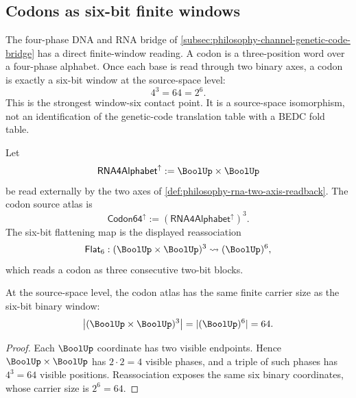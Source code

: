 \subsection{Codons as six-bit finite windows}
\label{subsec:philosophy-codon-window-six-bridge}

The four-phase DNA and RNA bridge of
\autoref{subsec:philosophy-channel-genetic-code-bridge} has a direct
finite-window reading. A codon is a three-position word over a
four-phase alphabet. Once each base is read through two binary axes, a
codon is exactly a six-bit window at the source-space level:
$$
  4^{3}=64=2^{6}.
$$
This is the strongest window-six contact point. It is a source-space
isomorphism, not an identification of the genetic-code translation
table with a BEDC fold table.

\begin{definition}
\label{def:philosophy-codon-six-bit-source-atlas}
Let
$$
  \mathsf{RNA4Alphabet}^{\uparrow}
  :=
  \BoolUp\times\BoolUp
$$
be read externally by the two axes of
\autoref{def:philosophy-rna-two-axis-readback}. The codon source atlas
is
$$
  \mathsf{Codon64}^{\uparrow}
  :=
  (\mathsf{RNA4Alphabet}^{\uparrow})^{3}.
$$
The six-bit flattening map is the displayed reassociation
$$
  \mathsf{Flat}_{6}
  :
  (\BoolUp\times\BoolUp)^{3}
  \rightsquigarrow
  (\BoolUp)^{6},
$$
which reads a codon as three consecutive two-bit blocks.
\end{definition}

\begin{theorem}
\label{thm:philosophy-codon-source-space-six-bit-window}
At the source-space level, the codon atlas has the same finite carrier
size as the six-bit binary window:
$$
  \left|(\BoolUp\times\BoolUp)^{3}\right|
  =
  |(\BoolUp)^{6}|
  =
  64.
$$
\end{theorem}
\begin{proof}
Each $\BoolUp$ coordinate has two visible endpoints. Hence
$\BoolUp\times\BoolUp$ has $2\cdot 2=4$ visible phases, and a triple
of such phases has $4^{3}=64$ visible positions. Reassociation exposes
the same six binary coordinates, whose carrier size is $2^{6}=64$.
\end{proof}

